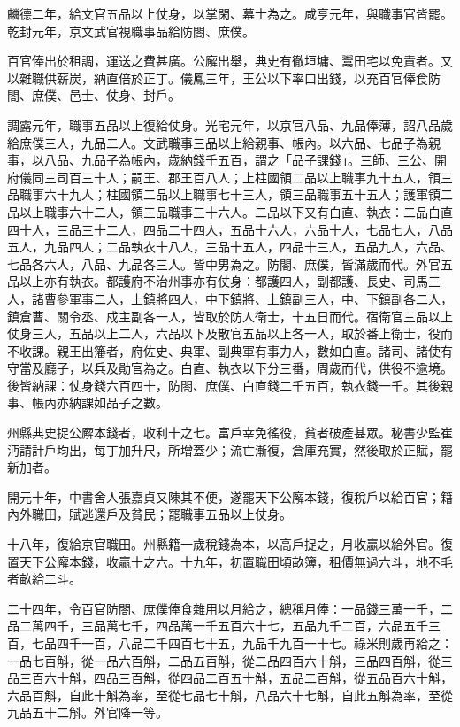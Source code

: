 \begin{pinyinscope}
 麟德二年，給文官五品以上仗身，以掌閑、幕士為之。咸亨元年，與職事官皆罷。乾封元年，京文武官視職事品給防閤、庶僕。



 百官俸出於租調，運送之費甚廣。公廨出舉，典史有徹垣墉、鬻田宅以免責者。又以雜職供薪炭，納直倍於正丁。儀鳳三年，王公以下率口出錢，以充百官俸食防閤、庶僕、邑士、仗身、封戶。



 調露元年，職事五品以上復給仗身。光宅元年，以京官八品、九品俸薄，詔八品歲給庶僕三人，九品二人。文武職事三品以上給親事、帳內。以六品、七品子為親事，以八品、九品子為帳內，歲納錢千五百，謂之「品子課錢」。三師、三公、開府儀同三司百三十人；嗣王、郡王百八人；上柱國領二品以上職事九十五人，領三品職事六十九人；柱國領二品以上職事七十三人，領三品職事五十五人；護軍領二品以上職事六十二人，領三品職事三十六人。二品以下又有白直、執衣：二品白直四十人，三品三十二人，四品二十四人，五品十六人，六品十人，七品七人，八品五人，九品四人；二品執衣十八人，三品十五人，四品十三人，五品九人，六品、七品各六人，八品、九品各三人。皆中男為之。防閤、庶僕，皆滿歲而代。外官五品以上亦有執衣。都護府不治州事亦有仗身：都護四人，副都護、長史、司馬三人，諸曹參軍事二人，上鎮將四人，中下鎮將、上鎮副三人，中、下鎮副各二人，鎮倉曹、關令丞、戍主副各一人，皆取於防人衛士，十五日而代。宿衛官三品以上仗身三人，五品以上二人，六品以下及散官五品以上各一人，取於番上衛士，役而不收課。親王出籓者，府佐史、典軍、副典軍有事力人，數如白直。諸司、諸使有守當及廳子，以兵及勛官為之。白直、執衣以下分三番，周歲而代，供役不逾境。後皆納課：仗身錢六百四十，防閤、庶僕、白直錢二千五百，執衣錢一千。其後親事、帳內亦納課如品子之數。



 州縣典史捉公廨本錢者，收利十之七。富戶幸免徭役，貧者破產甚眾。秘書少監崔沔請計戶均出，每丁加升尺，所增蓋少；流亡漸復，倉庫充實，然後取於正賦，罷新加者。



 開元十年，中書舍人張嘉貞又陳其不便，遂罷天下公廨本錢，復稅戶以給百官；籍內外職田，賦逃還戶及貧民；罷職事五品以上仗身。



 十八年，復給京官職田。州縣籍一歲稅錢為本，以高戶捉之，月收贏以給外官。復置天下公廨本錢，收贏十之六。十九年，初置職田頃畝簿，租價無過六斗，地不毛者畝給二斗。



 二十四年，令百官防閤、庶僕俸食雜用以月給之，總稱月俸：一品錢三萬一千，二品二萬四千，三品萬七千，四品萬一千五百六十七，五品九千二百，六品五千三百，七品四千一百，八品二千四百七十五，九品千九百一十七。祿米則歲再給之：一品七百斛，從一品六百斛，二品五百斛，從二品四百六十斛，三品四百斛，從三品三百六十斛，四品三百斛，從四品二百五十斛，五品二百斛，從五品百六十斛，六品百斛，自此十斛為率，至從七品七十斛，八品六十七斛，自此五斛為率，至從九品五十二斛。外官降一等。




\end{pinyinscope}
